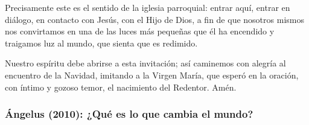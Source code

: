 \begin{body}
					Precisamente este es el sentido de la iglesia parroquial: entrar aquí, entrar en diálogo, en contacto con Jesús, con el Hijo de Dios, a fin de que nosotros mismos nos convirtamos en una de las luces más pequeñas que él ha encendido y traigamos luz al mundo, que sienta que es redimido.
					
					Nuestro espíritu debe abrirse a esta invitación; así caminemos con alegría al encuentro de la Navidad, imitando a la Virgen María, que esperó en la oración, con íntimo y gozoso temor, el nacimiento del Redentor. Amén.
				\end{body}

			\subsubsection{Ángelus (2010): ¿Qué es lo que cambia el mundo?}
				
